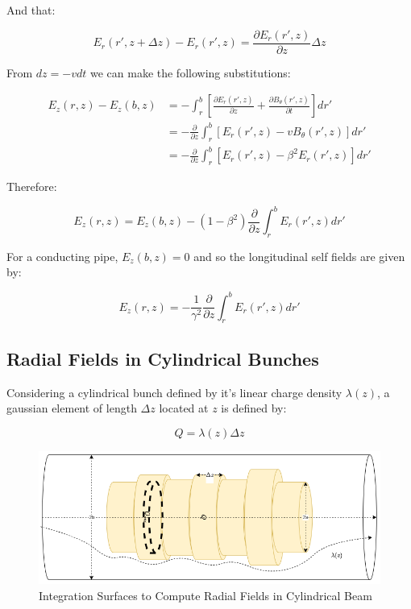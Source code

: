 And that:

$$E_r(r', z+\Delta z)-E_r(r', z) = \frac{\partial E_r(r', z)}{\partial z}\Delta z$$

From $dz = -vdt$ we can make the following substitutions:

$$\begin{aligned}
        E_z(r,z)-E_z(b,z) & = -\int_r^b\left[\frac{\partial E_r(r', z)}{\partial z}+\frac{\partial B_{\theta}(r', z)}{\partial t}\right]dr' \\
                          & =-\frac{\partial}{\partial z}\int_r^b[E_r(r',z)-vB_{\theta}(r',z)]dr'                                           \\
                          & =-\frac{\partial}{\partial z}\int_r^b[E_r(r',z)-\beta^2E_r(r',z)]dr'
    \end{aligned}$$

Therefore:

$$E_z(r,z) = E_z(b,z)-(1-\beta^2)\frac{\partial}{\partial z}\int_r^bE_r(r',z)dr'$$

For a conducting pipe, $E_z(b,z)=0$ and so the longitudinal self fields are given by:

$$E_z(r, z) = -\frac{1}{\gamma^2}\frac{\partial}{\partial z}\int_r^bE_r(r', z)dr'$$

\subsection{Radial Fields in Cylindrical Bunches}

Considering a cylindrical bunch defined by it's linear charge density $\lambda(z)$, a gaussian element of length $\Delta z$ located at $z$ is defined by:

$$Q = \lambda(z) \Delta z$$

\begin{figure}
    \centering
    \includegraphics{./figs/gaussian_cylindrical_bunch.png}
    \caption{Integration Surfaces to Compute Radial Fields in Cylindrical Beam}

\end{figure}

